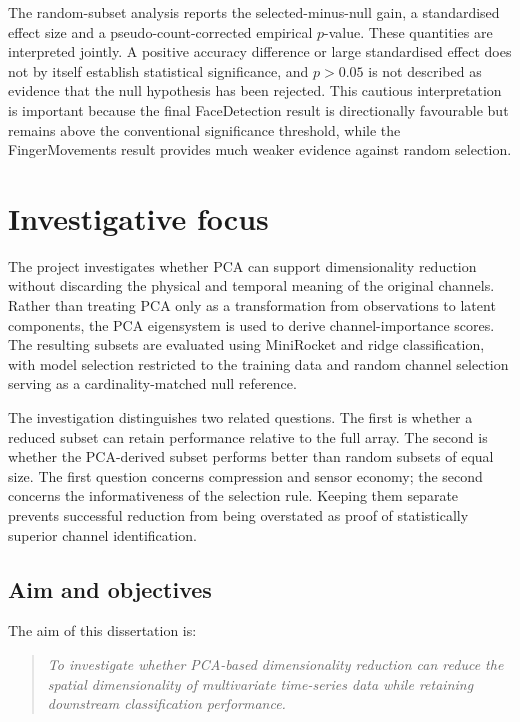 The random-subset analysis reports the selected-minus-null gain, a standardised effect size and a pseudo-count-corrected empirical $p$-value. These quantities are interpreted jointly. A positive accuracy difference or large standardised effect does not by itself establish statistical significance, and $p>0.05$ is not described as evidence that the null hypothesis has been rejected. This cautious interpretation is important because the final FaceDetection result is directionally favourable but remains above the conventional significance threshold, while the FingerMovements result provides much weaker evidence against random selection.

\section{Investigative focus}

The project investigates whether PCA can support dimensionality reduction without discarding the physical and temporal meaning of the original channels. Rather than treating PCA only as a transformation from observations to latent components, the PCA eigensystem is used to derive channel-importance scores. The resulting subsets are evaluated using MiniRocket and ridge classification, with model selection restricted to the training data and random channel selection serving as a cardinality-matched null reference.

The investigation distinguishes two related questions. The first is whether a reduced subset can retain performance relative to the full array. The second is whether the PCA-derived subset performs better than random subsets of equal size. The first question concerns compression and sensor economy; the second concerns the informativeness of the selection rule. Keeping them separate prevents successful reduction from being overstated as proof of statistically superior channel identification.

\subsection{Aim and objectives}

The aim of this dissertation is:

\begin{quote}
\emph{To investigate whether PCA-based dimensionality reduction can reduce the spatial dimensionality of multivariate time-series data while retaining downstream classification performance.}
\end{quote}

